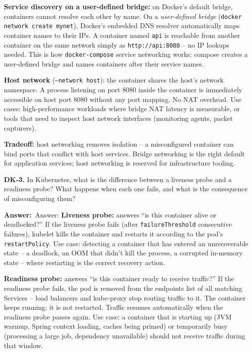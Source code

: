 \documentclass[letterpaper,10pt]{article}
\newlength{\boxwidth}
\newcommand{\answerlabel}{\noindent\textbf{\textcolor{answerblue}{Answer:}}~}
\begin{document}
\textbf{Service discovery on a user-defined bridge:} on Docker's default bridge, containers cannot resolve each other by name. On a \textit{user-defined bridge} (\texttt{docker network create mynet}), Docker's embedded DNS resolver automatically maps container names to their IPs. A container named \texttt{api} is reachable from another container on the same network simply as \texttt{http://api:8080} -- no IP lookups needed. This is how \texttt{docker-compose} service networking works: compose creates a user-defined bridge and names containers after their service names.

\textbf{Host network} (\texttt{--network host}): the container shares the host's network namespace. A process listening on port 8080 inside the container is immediately accessible on host port 8080 without any port mapping. No NAT overhead. Use cases: high-performance workloads where bridge NAT latency is measurable, or tools that need to inspect host network interfaces (monitoring agents, packet capturers).

\textbf{Tradeoff:} host networking removes isolation -- a misconfigured container can bind ports that conflict with host services. Bridge networking is the right default for application services; host networking is reserved for infrastructure tooling.

\vspace{6pt}

\colorbox{qbg}{\begin{minipage}{\boxwidth}
\textbf{DK-3.} In Kubernetes, what is the difference between a liveness probe and a readiness probe? What happens when each one fails, and what is the consequence of misconfiguring them?
\end{minipage}}

\vspace{2pt}
\answerlabel{Answer:} \textbf{Liveness probe:} answers ``is this container alive or deadlocked?'' If the liveness probe fails (after \texttt{failureThreshold} consecutive failures), kubelet kills the container and restarts it according to the pod's \texttt{restartPolicy}. Use case: detecting a container that has entered an unrecoverable state -- a deadlock, an OOM that didn't kill the process, a corrupted in-memory state -- where restarting is the correct recovery action.

\textbf{Readiness probe:} answers ``is this container ready to receive traffic?'' If the readiness probe fails, the pod is removed from the endpoints list of all matching Services -- load balancers and kube-proxy stop routing traffic to it. The container keeps running; it is not restarted. Traffic resumes automatically when the readiness probe passes again. Use case: a container that is starting up (JVM warmup, Spring context loading, caches being primed) or temporarily busy (processing a large job, dependency unavailable) should not receive traffic during that window.
\end{document}
